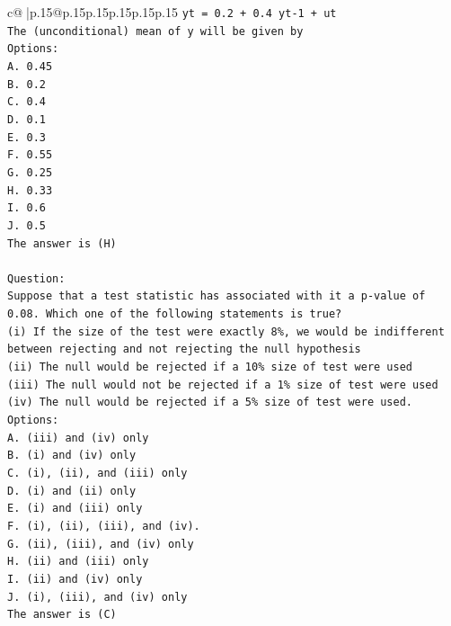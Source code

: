 \documentclass{article}
\begin{document}
{\begin{supertabular}{c@{$\;$}|p{.15\linewidth}@{}p{.15\linewidth}p{.15\linewidth}p{.15\linewidth}p{.15\linewidth}p{.15\linewidth}}
{{{\texttt{yt = 0.2 + 0.4 yt{-}1 + ut} \\
\texttt{The (unconditional) mean of y will be given by} \\
\texttt{Options:} \\
\texttt{A. 0.45} \\
\texttt{B. 0.2} \\
\texttt{C. 0.4} \\
\texttt{D. 0.1} \\
\texttt{E. 0.3} \\
\texttt{F. 0.55} \\
\texttt{G. 0.25} \\
\texttt{H. 0.33} \\
\texttt{I. 0.6} \\
\texttt{J. 0.5} \\
\texttt{The answer is (H)} \\
\\ 
\texttt{Question:} \\
\texttt{Suppose that a test statistic has associated with it a p{-}value of 0.08. Which one of the following statements is true?} \\
\texttt{(i) If the size of the test were exactly 8\%, we would be indifferent between rejecting and not rejecting the null hypothesis} \\
\texttt{(ii) The null would be rejected if a 10\% size of test were used} \\
\texttt{(iii) The null would not be rejected if a 1\% size of test were used} \\
\texttt{(iv) The null would be rejected if a 5\% size of test were used.} \\
\texttt{Options:} \\
\texttt{A. (iii) and (iv) only} \\
\texttt{B. (i) and (iv) only} \\
\texttt{C. (i), (ii), and (iii) only} \\
\texttt{D. (i) and (ii) only} \\
\texttt{E. (i) and (iii) only} \\
\texttt{F. (i), (ii), (iii), and (iv).} \\
\texttt{G. (ii), (iii), and (iv) only} \\
\texttt{H. (ii) and (iii) only} \\
\texttt{I. (ii) and (iv) only} \\
\texttt{J. (i), (iii), and (iv) only} \\
\texttt{The answer is (C)} \\
}}}
\end{supertabular}}
\end{document}
